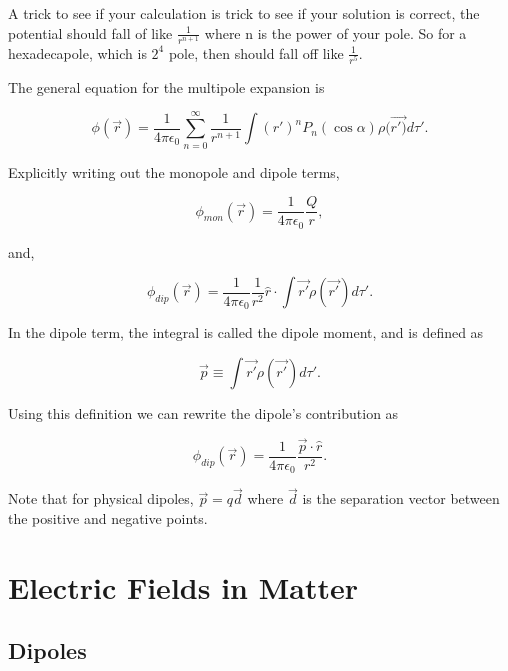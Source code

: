 \documentclass[preprint, review,12pt]{elsarticle}
\begin{document}
A trick to see if your calculation is trick to see if your solution is correct, the potential should fall of like $\frac{1}{r^{n+1}}$ where n is the power of your pole. So for a hexadecapole, which is $2^4$ pole, then should fall off like $\frac{1}{r^5}$.

The general equation for the multipole expansion is

\begin{equation}
    \phi(\vec{r}) = \frac{1}{4\pi \epsilon_0} \sum_{n=0}^\infty \frac{1}{r^{n+1}} \int (r')^n P_n(\cos \alpha ) \rho(\vec{r')}d\tau'.
\end{equation}


Explicitly writing out the monopole and dipole terms,

\begin{equation}
    \phi_{mon}(\vec{r}) = \frac{1}{4 \pi \epsilon_0} \frac{Q}{r},
\end{equation}

and,

\begin{equation}
    \phi_{dip}(\vec{r}) = \frac{1}{4 \pi \epsilon_0}\frac{1}{r^2}\hat{r}\cdot \int \vec{r'}\rho(\vec{r'})d\tau'.
\end{equation}

In the dipole term, the integral is called the dipole moment, and is defined as

\begin{equation}
    \vec{p} \equiv \int\vec{r'} \rho(\vec{r'})d\tau'.
\end{equation}

Using this definition we can rewrite the dipole's contribution as

\begin{equation}
    \phi_{dip}(\vec{r}) = \frac{1}{4 \pi \epsilon_0}\frac{\vec{p}\cdot \hat{r}}{r^2}.
\end{equation}

Note that for physical dipoles, $\vec{p} = q\vec{d}$ where $\vec{d}$ is the separation vector between the positive and negative points.

\section{Electric Fields in Matter}

\subsection{Dipoles}
\end{document}

